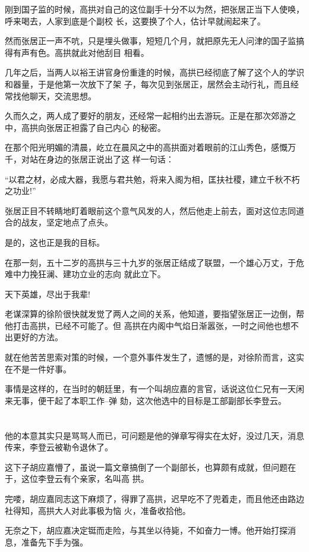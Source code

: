 \documentclass[11pt,a4paper,onecolumn]{article}
\begin{document}
刚到国子监的时候，高拱对自己的这位副手十分不以为然，把张居正当下人使唤，呼来喝去，人家到底是个副校
长，这要换了个人，估计早就闹起来了。

然而张居正一声不吭，只是埋头做事，短短几个月，就把原先无人问津的国子监搞得有声有色。高拱就此对他刮目
相看。

几年之后，当两人以裕王讲官身份重逢的时候，高拱已经彻底了解了这个人的学识和器量，于是他第一次放下了架
子，每次见到张居正，居然会主动行礼，而且经常找他聊天，交流思想。

久而久之，两人成了要好的朋友，还经常一起相约出去游玩。正是在那次郊游之中，高拱向张居正袒露了自己内心
的秘密。

在那个阳光明媚的清晨，屹立在晨风之中的高拱面对着眼前的江山秀色，感慨万千，对站在身边的张居正说出了这
样一句话：

``以君之材，必成大器，我愿与君共勉，将来入阁为相，匡扶社稷，建立千秋不朽之功业!''

张居正目不转睛地盯着眼前这个意气风发的人，然后他走上前去，面对这位志同道合的战友，坚定地点了点头。

是的，这也正是我的目标。

在那一刻，五十二岁的高拱与三十九岁的张居正结成了联盟，一个雄心万丈，于危难中力挽狂澜、建功立业的志向
就此立下。

天下英雄，尽出于我辈!

老谋深算的徐阶很快就发觉了两人之间的关系，他知道，要指望张居正一边倒，帮他打击高拱，已经不可能了。但
高拱在内阁中气焰日渐嚣张，一时之间他也想不出更好的方法。

就在他苦苦思索对策的时候，一个意外事件发生了，遗憾的是，对徐阶而言，这实在不是一件好事。

事情是这样的，在当时的朝廷里，有一个叫胡应嘉的言官，话说这位仁兄有一天闲来无事，便干起了本职工作--弹
劾，这次他选中的目标是工部副部长李登云。

\section[\thesection]{}

他的本意其实只是骂骂人而已，可问题是他的弹章写得实在太好，没过几天，消息传来，李登云被勒令退休了。

这下子胡应嘉懵了，虽说一篇文章搞倒了一个副部长，也算颇有成就，但问题在于，这位李登云有个亲家，名叫高
拱。

完喽，胡应嘉同志这下麻烦了，得罪了高拱，迟早吃不了兜着走，而且他还由路边社得知，高拱大人对此事极为恼
火，准备收拾他。

无奈之下，胡应嘉决定铤而走险，与其坐以待毙，不如奋力一博。他开始打探消息，准备先下手为强。
\end{document}
